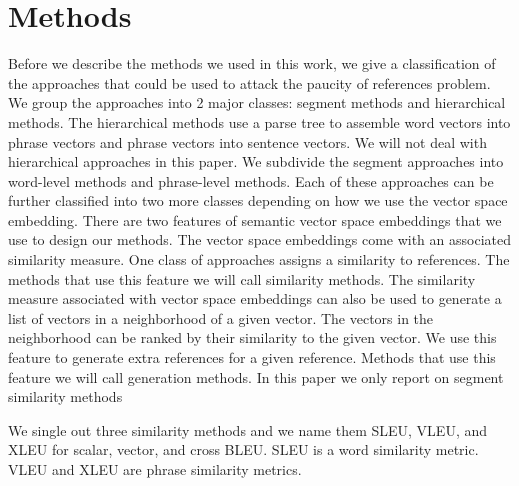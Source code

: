 
\section{Methods}
\label{sec:methods}




Before we describe the methods we used in this work, we give a classification of the approaches that could be used to attack the paucity of references problem. 
We group the approaches into 2 major classes: segment methods and hierarchical methods.
The hierarchical methods use a parse tree to assemble word vectors into phrase vectors and phrase vectors into sentence vectors. 
We will not deal with hierarchical approaches in this paper. 
We subdivide the segment approaches into word-level methods and phrase-level methods. 
Each of these approaches can be further  classified into two more classes depending on how we use the vector space embedding. 
There are two features of semantic vector space embeddings that we use to design our methods. 
The vector space embeddings come with an associated similarity measure. 
One class of approaches assigns a similarity to references. 
The methods that use this feature we will call similarity methods. 
The similarity measure associated with vector space embeddings can also be used to generate a list of vectors in a neighborhood of a given vector. 
The vectors in the neighborhood can be ranked by their similarity to the given vector. 
We use this feature to generate extra references for a  given reference.
Methods that use this feature we will call generation methods. 
In this paper we only report on segment similarity methods 

We single out three similarity methods and we name them SLEU, VLEU, and XLEU for scalar, vector, and cross BLEU. 
SLEU is a word similarity metric. 
VLEU and XLEU are phrase similarity metrics. 

